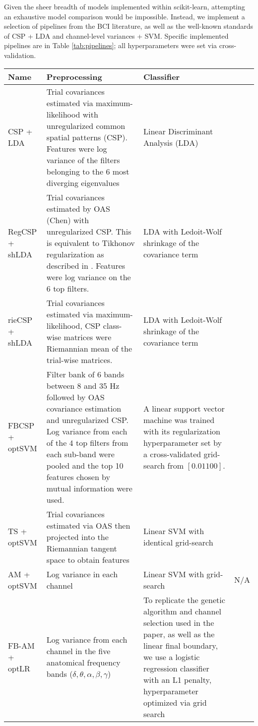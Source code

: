Given the sheer breadth of models implemented within scikit-learn,
attempting an exhaustive model comparison would be impossible. Instead, we
implement a selection of pipelines from the BCI literature, as well as the
well-known standards of CSP + LDA and channel-level variances + SVM. Specific
implemented pipelines are in Table \ref{tab:pipelines}; all hyperparameters were set via cross-validation.
\begin{table*}
  \centering
  \begin{tabular}{ l || p{6cm} | p{6cm} | c | }
    
    Name & Preprocessing & Classifier \\ \hline
    CSP + LDA & Trial covariances estimated via maximum-likelihood with unregularized common spatial patterns (CSP). Features were log variance of the filters belonging to the 6 most diverging eigenvalues & Linear Discriminant Analysis (LDA) & \cite{Koles1990} \\ \hline
    RegCSP + shLDA & Trial covariances estimated by OAS (Chen) with
                     unregularized CSP. This is equivalent to Tikhonov
                     regularization as described in \cite{Lotte2011}. Features were log variance on the 6 top filters. & LDA with Ledoit-Wolf shrinkage of the covariance term  & \cite{Lotte2011} \\ \hline
    rieCSP + shLDA & Trial covariances estimated via maximum-likelihood, CSP class-wise matrices were Riemannian mean of the trial-wise matrices. & LDA with Ledoit-Wolf shrinkage of the covariance term  & \cite{TODO} \\ \hline
    FBCSP + optSVM & Filter bank of 6 bands between 8 and 35 Hz followed by OAS covariance estimation and unregularized CSP. Log variance from each of the 4 top filters from each sub-band were pooled and the top 10 features chosen by mutual information were used. & A linear support vector machine was trained with its regularization hyperparameter set by a cross-validated grid-search from $[0.01 100]$. & \cite{KaiKengAng2008} \\ \hline
    TS + optSVM & Trial covariances estimated via OAS then projected into the Riemannian tangent space to obtain features & Linear SVM with identical grid-search & \cite{Barachant2013} \\ \hline
    AM + optSVM & Log variance in each channel & Linear SVM with grid-search & N/A \\ \hline
    FB-AM + optLR & Log variance from each channel in the five anatomical frequency bands ($\delta, \theta, \alpha, \beta, \gamma$) & To replicate the genetic algorithm and channel selection used in the paper, as well as the linear final boundary, we use a logistic regression classifier with an L1 penalty, hyperparameter optimized via grid search& \cite{Garrett2003} \\
    
  \end{tabular}
  \caption{Processing pipelines}
  \label{tab:pipelines}
\end{table*}
  

